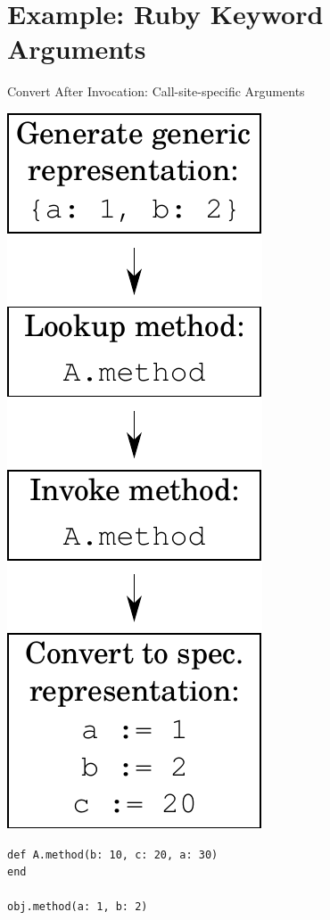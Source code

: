 \documentclass[xcolor=dvipsname]{beamer} %
\begin{document}
\section{Example: Ruby Keyword Arguments}
\begin{frame}[fragile]{Convert After Invocation: Call-site-specific Arguments}
\begin{minipage}{0.25\textwidth}
\centering
\includegraphics[height=0.8\textheight]{convert_after.pdf}
\end{minipage} %
\begin{minipage}{0.7\textwidth}
\begin{lstlisting}
def A.method(b: 10, c: 20, a: 30)
end

obj.method(a: 1, b: 2)
\end{lstlisting}
\end{minipage}
\end{frame}
\end{document}
